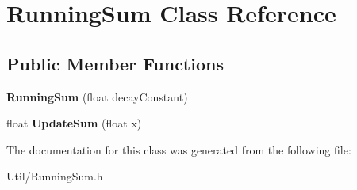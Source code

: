\hypertarget{class_running_sum}{
\section{\-Running\-Sum \-Class \-Reference}
\label{class_running_sum}
}
\subsection*{\-Public \-Member \-Functions}
\begin{DoxyCompactItemize}
\item 
\hypertarget{class_running_sum_a3ef30833e073d096a2561bad579139b3}{
{\bfseries \-Running\-Sum} (float decay\-Constant)}
\label{class_running_sum_a3ef30833e073d096a2561bad579139b3}

\item 
\hypertarget{class_running_sum_a2ce3ef61ad0966adc167f499bbd676a9}{
float {\bfseries \-Update\-Sum} (float x)}
\label{class_running_sum_a2ce3ef61ad0966adc167f499bbd676a9}

\end{DoxyCompactItemize}


\-The documentation for this class was generated from the following file\-:\begin{DoxyCompactItemize}
\item 
\-Util/\-Running\-Sum.\-h\end{DoxyCompactItemize}

